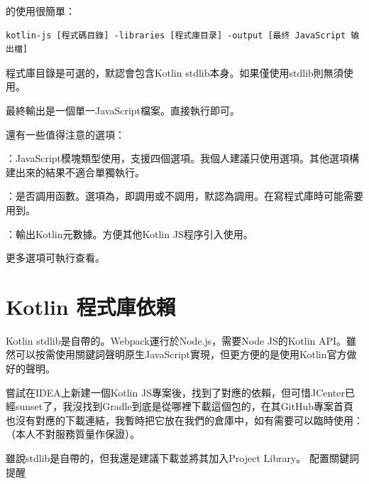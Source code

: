 的使用很簡單：

\begin{lstlisting}
kotlin-js [程式碼目錄] -libraries [程式庫目录] -output [最终 JavaScript 输出檔]
\end{lstlisting}

程式庫目錄是可選的，默認會包含Kotlin stdlib本身。如果僅使用stdlib則無須使用。

最終輸出是一個單一JavaScript檔案。直接執行即可。

還有一些值得注意的選項：

\begin{compactitem}
    \item {}：JavaScript模塊類型使用，支援四個選項。我個人建議只使用選項。其他選項構建出來的結果不適合單獨執行。
    \item {}：是否調用函數。選項為，即調用或不調用，默認為調用。在寫程式庫時可能需要用到。
    \item {}：輸出Kotlin元數據。方便其他Kotlin JS程序引入使用。
\end{compactitem}

更多選項可執行查看。








\section*{Kotlin 程式庫依賴}

Kotlin stdlib是自帶的。Webpack運行於Node.js，需要Node JS的Kotlin API。雖然可以按需使用關鍵詞聲明原生JavaScript實現，但更方便的是使用Kotlin官方做好的聲明。

嘗試在IDEA上新建一個Kotlin JS專案後，找到了對應的依賴，但可惜JCenter已經sunset了，我沒找到Gradle到底是從哪裡下載這個包的，在其GitHub專案首頁也沒有對應的下載連結，我暫時把它放在我們的倉庫中，如有需要可以臨時使用：（本人不對服務質量作保證）。

雖說stdlib是自帶的，但我還是建議下載並將其加入Project Library。
配置關鍵詞提醒

